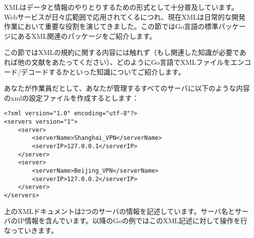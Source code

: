 XMLはデータと情報のやりとりするための形式として十分普及しています。Webサービスが日々広範囲で応用されてくるにつれ、現在XMLは日常的な開発作業において重要な役割を演じてきました。この節ではGo言語の標準パッケージにあるXML関連のパッケージをご紹介します。

この節ではXMLの規約に関する内容には触れず（もし関連した知識が必要であれば他の文献をあたってください）、どのようにGo言語でXMLファイルをエンコード/デコードするかといった知識についてご紹介します。

あなたが作業員だとして、あなたが管理するすべてのサーバに以下のような内容のxmlの設定ファイルを作成するとします：

\begin{lstlisting}[numbers=none]
<?xml version="1.0" encoding="utf-8"?>
<servers version="1">
    <server>
        <serverName>Shanghai_VPN</serverName>
        <serverIP>127.0.0.1</serverIP>
    </server>
    <server>
        <serverName>Beijing_VPN</serverName>
        <serverIP>127.0.0.2</serverIP>
    </server>
</servers>
\end{lstlisting}

上のXMLドキュメントは2つのサーバの情報を記述しています。サーバ名とサーバのIP情報を含んでいます。以降のGoの例ではこのXML記述に対して操作を行なっていきます。

